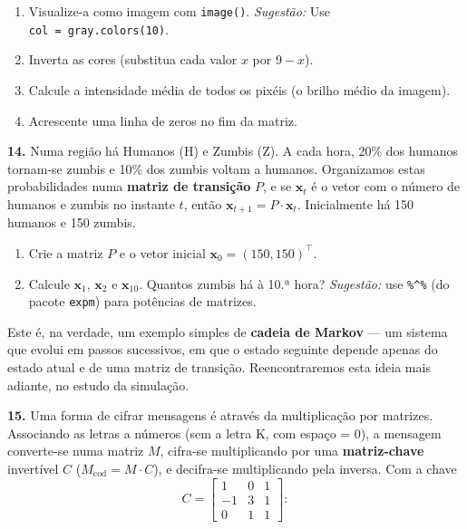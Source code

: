 \documentclass[
  portuguese,
  11pt,
  openany]{book}
\providecommand{\tightlist}{%
  \setlength{\itemsep}{0pt}\setlength{\parskip}{0pt}}
\begin{document}
\begin{enumerate}
\def\labelenumi{(\alph{enumi})}
\setcounter{enumi}{1}
\tightlist
\item
  Visualize-a como imagem com \texttt{image()}.
  \emph{Sugestão:} Use \texttt{col\ =\ gray.colors(10)}.
\item
  Inverta as cores (substitua cada valor \(x\) por \(9 - x\)).
\item
  Calcule a intensidade média de todos os pixéis (o brilho médio da imagem).
\item
  Acrescente uma linha de zeros no fim da matriz.
\end{enumerate}

\textbf{14.} Numa região há Humanos (H) e Zumbis (Z). A cada hora, 20\% dos humanos
tornam-se zumbis e 10\% dos zumbis voltam a humanos. Organizamos estas
probabilidades numa \textbf{matriz de transição} \(P\), e se \(\mathbf{x}_t\) é o vetor com
o número de humanos e zumbis no instante \(t\), então
\(\mathbf{x}_{t+1} = P \cdot \mathbf{x}_t\). Inicialmente há 150 humanos e 150
zumbis.

\begin{enumerate}
\def\labelenumi{(\alph{enumi})}
\tightlist
\item
  Crie a matriz \(P\) e o vetor inicial \(\mathbf{x}_0 = (150, 150)^\top\).
\item
  Calcule \(\mathbf{x}_1\), \(\mathbf{x}_2\) e \(\mathbf{x}_{10}\). Quantos zumbis há
  à 10.ª hora?
  \emph{Sugestão:} use \texttt{\%\^{}\%} (do pacote \texttt{expm}) para potências de
  matrizes.
\end{enumerate}

Este é, na verdade, um exemplo simples de \textbf{cadeia de Markov} --- um sistema que
evolui em passos sucessivos, em que o estado seguinte depende apenas do estado
atual e de uma matriz de transição. Reencontraremos esta ideia mais adiante, no
estudo da simulação.

\textbf{15.} Uma forma de cifrar mensagens é através da multiplicação por matrizes.
Associando as letras a números (sem a letra K, com espaço = 0), a mensagem
converte-se numa matriz \(M\), cifra-se multiplicando por uma \textbf{matriz-chave}
invertível \(C\) (\(M_{\text{cod}} = M \cdot C\)), e decifra-se multiplicando pela
inversa. Com a chave
\[C = \begin{bmatrix} 1 & 0 & 1 \\ -1 & 3 & 1 \\ 0 & 1 & 1 \end{bmatrix}:\]
\end{document}

